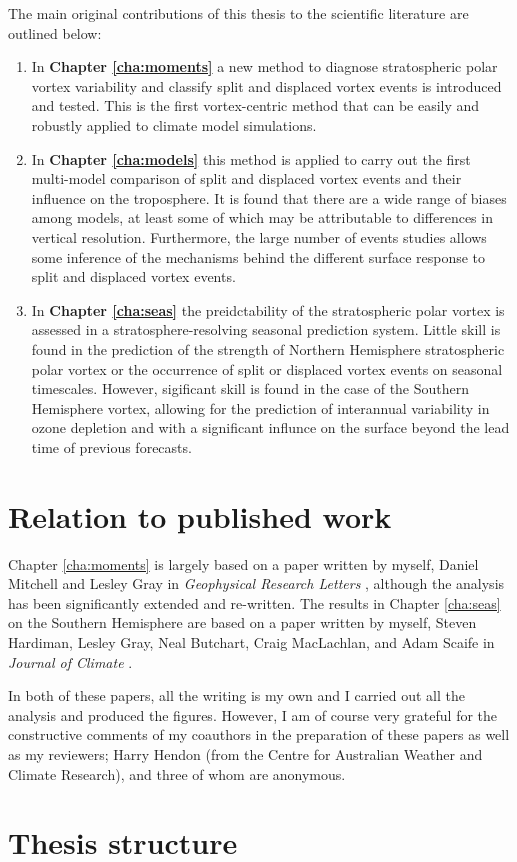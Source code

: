 The main original contributions of this thesis to the scientific literature are
outlined below:
\begin{enumerate}[1.]
\item In \textbf{Chapter \ref{cha:moments}} a new method to diagnose
  stratospheric polar vortex variability and classify split and displaced vortex
  events is introduced and tested. This is the first vortex-centric method that
  can be easily and robustly applied to climate model simulations.

\item In \textbf{Chapter \ref{cha:models}} this method is applied to carry out
  the first multi-model comparison of split and displaced vortex events and
  their influence on the troposphere. It is found that there are a wide range of
  biases among models, at least some of which may be attributable to differences
  in vertical resolution. Furthermore, the large number of events studies allows
  some inference of the mechanisms behind the different surface response to
  split and displaced vortex events. 

\item In \textbf{Chapter \ref{cha:seas}} the preidctability of the stratospheric
  polar vortex is assessed in a stratosphere-resolving seasonal prediction
  system. Little skill is found in the prediction of the strength of Northern
  Hemisphere stratospheric polar vortex or the occurrence of split or displaced
  vortex events on seasonal timescales. However, sigificant skill is found in
  the case of the Southern Hemisphere vortex, allowing for the prediction of
  interannual variability in ozone depletion and with a significant influnce on
  the surface beyond the lead time of previous forecasts. 
\end{enumerate}

\section{Relation to published work}
Chapter \ref{cha:moments} is largely based on a paper written by myself, Daniel
Mitchell and Lesley Gray in \emph{Geophysical Research Letters}
\citep{Seviour2013}, although the analysis has been significantly extended and
re-written. The results in Chapter \ref{cha:seas} on the Southern Hemisphere are
based on a paper written by myself, Steven Hardiman, Lesley Gray, Neal Butchart,
Craig MacLachlan, and Adam Scaife in \emph{Journal of Climate}
\citep{Seviour2014}. 

In both of these papers, all the writing is my own and I carried out all the
analysis and produced the figures. However, I am of course very grateful for the
constructive comments of my coauthors in the preparation of these papers as well
as my reviewers; Harry Hendon (from the Centre for Australian Weather and
Climate Research), and three of whom are anonymous.

\section{Thesis structure}









